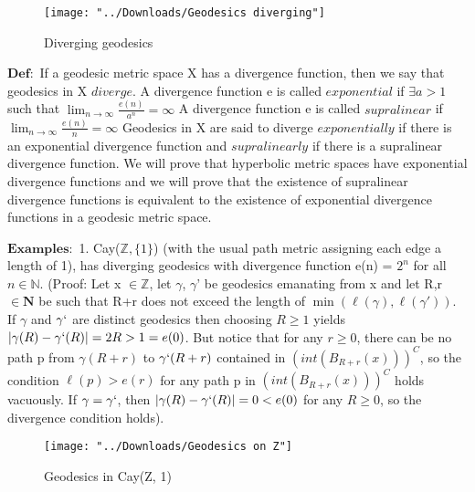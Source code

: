 \documentclass[11pt]{article}
\newcommand{\vs}{\vskip10pt}
\begin{document}
	\begin{figure}[h]
		\centering
		\texttt{[image: "../Downloads/Geodesics diverging"]}
		\caption{Diverging geodesics}
		\label{Figure 1: Diverging geodesics}
		
	\end{figure}
	\vs
	$\mathbf{Def:}$ If a geodesic metric space X has a divergence function, then we say that geodesics in X $\mathit{diverge}$. 
	\vs
	A divergence function e is called $\mathit{exponential }$ if $\exists a > 1 $ such that $\lim_{n \rightarrow \infty} \frac{e(n)}{a^n} = \infty$
	\vs 
	A divergence function e is called $\mathit{supralinear}$ if $\lim_{n \rightarrow \infty} \frac{e(n)}{n} = \infty$
	\vs
	Geodesics in X are said to diverge $\mathit{exponentially}$ if there is an exponential divergence function and $\mathit{supralinearly}$ if there is a supralinear divergence function. We will prove that hyperbolic metric spaces have exponential divergence functions and we will prove that the existence of supralinear divergence functions is equivalent to the existence of exponential divergence functions in a geodesic metric space. 
	
	
	\vskip60pt
	$\mathbf{Examples:}$
	\vs
	1. Cay($\mathbb{Z}, \{1\}$) (with the usual path metric assigning each edge a length of 1), has diverging geodesics with divergence function e(n) = $2^n$ for all $n \in \mathbb{N}$.
	(Proof: Let x $\in \mathbb{Z}$, let $\gamma$, $\gamma$' be geodesics emanating from x and let R,r $\in \mathbf{N}$ be such that R+r does not exceed the length of $ \min(\ell(\gamma), \ell(\gamma'))$. If $\gamma$ and $\gamma`$ are distinct geodesics then choosing $R \geq 1$ yields $\vert \gamma(R) - \gamma`(R) \vert = 2R > 1 = e(0)$. But notice that for any $r \geq 0$, there can be no path p from $\gamma(R+r)$ to $\gamma`(R+r)$ contained in $(int(B_{R+r}(x)))^C$, so the condition $\ell(p) > e(r)$ for any path p in $(int(B_{R+r}(x)))^C$ holds vacuously. If $\gamma = \gamma`$, then $\vert \gamma(R) - \gamma`(R) \vert = 0 < e(0)$ for any $R \geq 0$, so the divergence condition holds).

		\begin{figure}[h]
		\centering
		\texttt{[image: "../Downloads/Geodesics on Z"]}
		\caption{Geodesics in Cay(Z, {1})}
		\label{Figure 2: Geodesics in Cay(Z, {1})}
		
	\end{figure}
	
\end{document}
